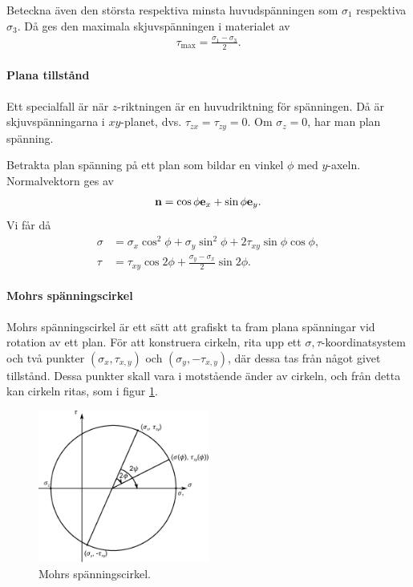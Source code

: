 Beteckna även den största respektiva minsta huvudspänningen som $\sigma_{1}$ respektiva $\sigma_{3}$. Då ges den maximala skjuvspänningen i materialet av
\begin{align*}
	\tau_{\text{max}} = \frac{\sigma_{1} - \sigma_{3}}{2}.
\end{align*}

\paragraph{Plana tillstånd}
Ett specialfall är när $z$-riktningen är en huvudriktning för spänningen. Då är skjuvspänningarna i $xy$-planet, dvs. $\tau_{zx} = \tau_{zy} = 0$. Om $\sigma_{z} = 0$, har man plan spänning.

Betrakta plan spänning på ett plan som bildar en vinkel $\phi$ med $y$-axeln. Normalvektorn ges av
\begin{align*}
	\vb{n} = \cos{\phi}\vb{e}_{x} + \sin{\phi}\vb{e}_{y}.
\end{align*}
Vi får då
\begin{align*}
	\sigma &= \sigma_{x}\cos^{2}{\phi} + \sigma_{y}\sin^{2}{\phi} + 2\tau_{xy}\sin{\phi}\cos{\phi}, \\
	\tau   &= \tau_{xy}\cos{2\phi} + \frac{\sigma_{y} - \sigma_{x}}{2}\sin{2\phi}.
\end{align*}

\paragraph{Mohrs spänningscirkel}
Mohrs spänningscirkel är ett sätt att grafiskt ta fram plana spänningar vid rotation av ett plan. För att konstruera cirkeln, rita upp ett $\sigma, \tau$-koordinatsystem och två punkter $(\sigma_{x}, \tau_{x, y})$ och $(\sigma_{y}, -\tau_{x, y})$, där dessa tas från något givet tillstånd. Dessa punkter skall vara i motstående änder av cirkeln, och från detta kan cirkeln ritas, som i figur \ref{fig:mohr_stress_circle}.

\begin{figure}[!ht]
	\centering
	\includegraphics[width = 0.5\textwidth]{./Images/mohr_stress_circle.eps}
	\caption{Mohrs spänningscirkel.}
	\label{fig:mohr_stress_circle}
\end{figure}

